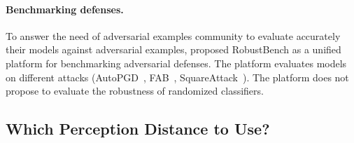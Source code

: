 \paragraph{Benchmarking defenses.} To answer the need of adversarial examples community to evaluate accurately their models against adversarial examples, \cite{croce2020robustbench} proposed RobustBench as a unified platform for benchmarking adversarial defenses. The platform evaluates models on different attacks (AutoPGD~\citep{Croce2020ReliableEO}, FAB~\citep{Croce2020MinimallyDA}, SquareAttack~\citep{andriushchenko2019square}). The platform  does not propose to evaluate the robustness of randomized classifiers. 

\subsection{Which Perception Distance to Use?}
